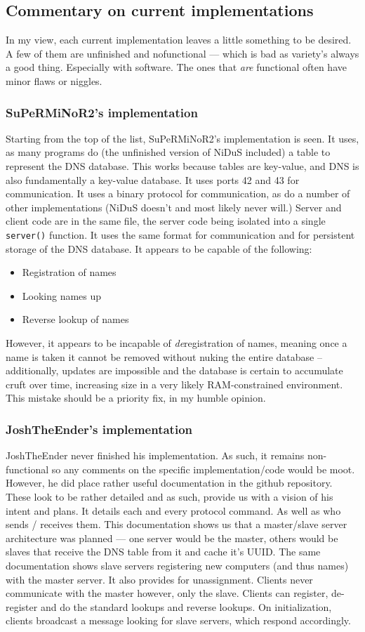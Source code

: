 \documentclass[]{report}
\begin{document}
\subsection{Commentary on current implementations}
In my view, each current implementation leaves a little something to be desired.  A few of them are unfinished and nofunctional --- which is bad as variety's always a good thing. Especially with software. The ones that \emph{are} functional often have minor flaws or niggles. \subsubsection{SuPeRMiNoR2's implementation}
Starting from the top of the list, SuPeRMiNoR2's implementation is seen. It uses, as many programs do (the unfinished version of NiDuS included) a table to represent the DNS database. This works because tables are key-value, and DNS is also fundamentally a key-value database. It uses ports 42 and 43 for communication. It uses a binary protocol for communication, as do a number of other implementations (NiDuS doesn't and most likely never will.) Server and client code are in the same file, the server code being isolated into a single \texttt{server()} function. It uses the same format for communication and for persistent storage of the DNS database. It appears to be capable of the following:
\begin{itemize}
	\item Registration of names
	\item Looking names up
	\item Reverse lookup of names
\end{itemize}
However, it appears to be incapable of \emph{de}registration of names, meaning once a name is taken it cannot be removed without nuking the entire database -- additionally, updates are impossible and the database is certain to accumulate cruft over time, increasing size in a very likely RAM-constrained environment. This mistake should be a priority fix, in my humble opinion.
\subsubsection{JoshTheEnder's implementation}
JoshTheEnder never finished his implementation. As such, it remains non-functional so any comments on the specific implementation/code would be moot. However, he did place rather useful documentation in the github repository. These look to be rather detailed and as such, provide us with a vision of his intent and plans. It details each and every protocol command. As well as who sends / receives them. This documentation shows us that a master/slave server architecture was planned --- one server would be the master, others would be slaves that receive the DNS table from it and cache it's UUID. The same documentation shows slave servers registering new computers (and thus names) with the master server. It also provides for unassignment. Clients never communicate with the master however, only the slave. Clients can register, de-register and do the standard lookups and reverse lookups. On initialization, clients broadcast a message looking for slave servers, which respond accordingly.
\end{document}
